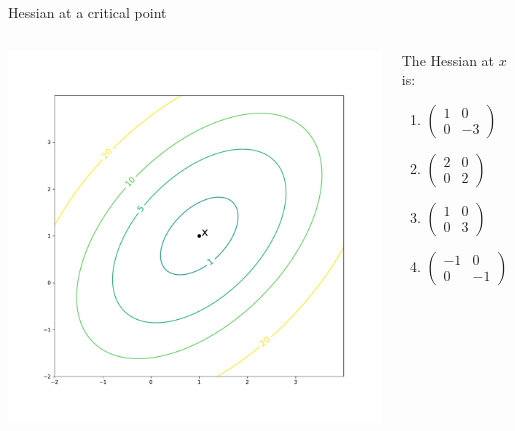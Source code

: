 \documentclass{beamer}
\begin{document}
\begin{frame}[t]{Hessian at a critical point}

	\vspace{-1.6cm}
	\begin{columns}
		\begin{column}{0.7\textwidth}
			\hspace*{-1.7cm}
			\includegraphics[width=11.0cm]{contour_min2.pdf}
		\end{column}
		\hspace*{0.2cm}
		\begin{column}{0.29\textwidth}
			The Hessian at $x$ is:
			\begin{enumerate}
				\item $\displaystyle
					\begin{pmatrix}
						1 & 0 \\
						0 & -3
					\end{pmatrix}$
				\item $\displaystyle
					\begin{pmatrix}
						2 & 0 \\
						0 & 2
					\end{pmatrix}$
				\item $\displaystyle
					\begin{pmatrix}
						1 & 0 \\
						0 & 3
					\end{pmatrix}$
				\item $\displaystyle
					\begin{pmatrix}
						-1 & 0 \\
						0 & -1
					\end{pmatrix}$
			\end{enumerate}
		\end{column}
	\end{columns}

\end{frame}
\end{document}
